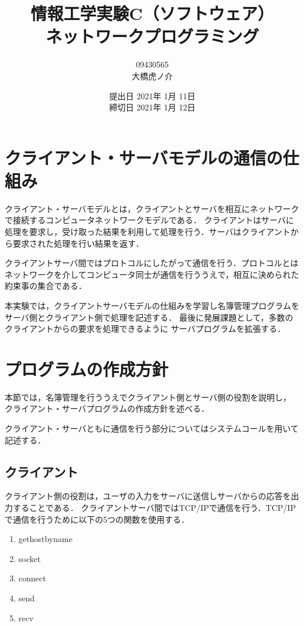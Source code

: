 \documentclass[11pt]{jarticle}
\begin{document}
\title{情報工学実験C（ソフトウェア）\\ネットワークプログラミング}
\author{09430565\\大橋虎ノ介}
\date{提出日 2021年 1月 11日\\
締切日 2021年  1月 12日}

\maketitle
\newpage

\section{クライアント・サーバモデルの通信の仕組み}

クライアント・サーバモデルとは，クライアントとサーバを相互にネットワークで接続するコンピュータネットワークモデルである．
クライアントはサーバに処理を要求し，受け取った結果を利用して処理を行う．サーバはクライアントから要求された処理を行い結果を返す．

クライアントサーバ間ではプロトコルにしたがって通信を行う．プロトコルとはネットワークを介してコンピュータ同士が通信を行ううえで，相互に決められた約束事の集合である．

本実験では，クライアントサーバモデルの仕組みを学習し名簿管理プログラムを
サーバ側とクライアント側で処理を記述する．
最後に発展課題として，多数のクライアントからの要求を処理できるように
サーバプログラムを拡張する．

\section{プログラムの作成方針}\label{sec:policy}

本節では，名簿管理を行ううえでクライアント側とサーバ側の役割を説明し，
クライアント・サーバプログラムの作成方針を述べる．

クライアント・サーバともに通信を行う部分についてはシステムコールを用いて記述する．

\subsection{クライアント} \label{sec:client_policy}

クライアント側の役割は，ユーザの入力をサーバに送信しサーバからの応答を出力することである．
クライアントサーバ間ではTCP/IPで通信を行う．TCP/IPで通信を行うために以下の5つの関数を使用する．


\begin{enumerate}
    \item gethostbyname
    \item socket
    \item connect
    \item send
    \item recv
\end{enumerate}
\end{document}
